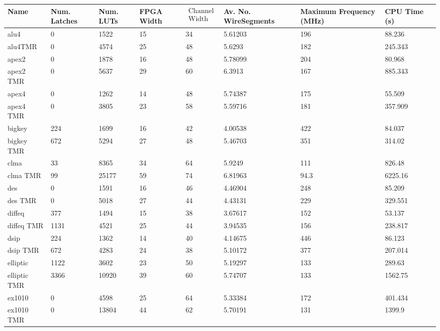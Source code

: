 \documentclass[12pt,final,oneside]{memoir} %
\begin{document}
\begin{table}
\footnotesize
\begin{adjustwidth}{-1cm}{-1.2cm}
    \begin{tabularx}{1.1\textwidth}{XXXXlXXXX}
    \toprule
Name & Num. Latches & Num. LUTs & FPGA Width & $\begin{matrix}\text{Channel}\\\text{Width}\end{matrix}$ & Av. No. Wire\newline Segments & Maximum Frequency (MHz) & CPU Time (s)\\\midrule
alu4 & 0 & 1522 & 15 & 34 & 5.61203 & 196 & 88.236\\
alu4TMR & 0 & 4574 & 25 & 48 & 5.6293 & 182 & 245.343\\\midrule
apex2 & 0 & 1878 & 16 & 48 & 5.78099 & 204 & 80.968\\
apex2 TMR & 0 & 5637 & 29 & 60 & 6.3913 & 167 & 885.343\\\midrule
apex4 & 0 & 1262 & 14 & 48 & 5.74387 & 175 & 55.509\\
apex4 TMR & 0 & 3805 & 23 & 58 & 5.59716 & 181 & 357.909\\\midrule
bigkey & 224 & 1699 & 16 & 42 & 4.00538 & 422 & 84.037\\
bigkey TMR & 672 & 5294 & 27 & 48 & 5.46703 & 351 & 314.02\\\midrule
clma & 33 & 8365 & 34 & 64 & 5.9249 & 111 & 826.48\\
clma TMR & 99 & 25177 & 59 & 74 & 6.81963 & 94.3 & 6225.16\\\midrule
des & 0 & 1591 & 16 & 46 & 4.46904 & 248 & 85.209\\
des TMR & 0 & 5018 & 27 & 44 & 4.43131 & 229 & 329.551\\\midrule
diffeq & 377 & 1494 & 15 & 38 & 3.67617 & 152 & 53.137\\
diffeq TMR & 1131 & 4521 & 25 & 44 & 3.94535 & 156 & 238.817\\\midrule
dsip & 224 & 1362 & 14 & 40 & 4.14675 & 446 & 86.123\\
dsip TMR & 672 & 4283 & 24 & 38 & 5.10172 & 377 & 207.014\\\midrule
elliptic & 1122 & 3602 & 23 & 50 & 5.19297 & 133 & 289.63\\
elliptic TMR & 3366 & 10920 & 39 & 60 & 5.74707 & 133 & 1562.75\\\midrule
ex1010 & 0 & 4598 & 25 & 64 & 5.33384 & 172 & 401.434\\
ex1010 TMR & 0 & 13804 & 44 & 62 & 5.70191 & 131 & 1399.9\\\midrule

\end{tabularx}
\end{adjustwidth}
\end{table}
\end{document}
